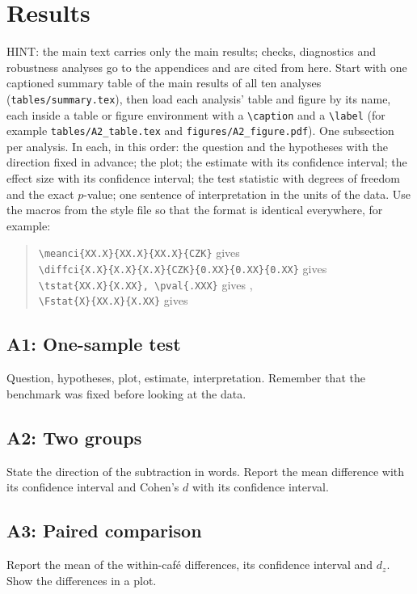 \documentclass[11pt,a4paper]{article}
\begin{document}
\section{Results}

HINT: the main text carries only the main results; checks, diagnostics and robustness analyses go to the appendices and are cited from here. Start with one captioned summary table of the main results of all ten analyses (\verb|tables/summary.tex|), then load each analysis' table and figure by its name, each inside a table or figure environment with a \verb|\caption| and a \verb|\label| (for example \verb|tables/A2_table.tex| and \verb|figures/A2_figure.pdf|). One subsection per analysis. In each, in this order: the question and the hypotheses with the direction fixed in advance; the plot; the estimate with its confidence interval; the effect size with its confidence interval; the test statistic with degrees of freedom and the exact $p$-value; one sentence of interpretation in the units of the data. Use the macros from the style file so that the format is identical everywhere, for example:

\begin{quote}\small
\verb|\meanci{XX.X}{XX.X}{XX.X}{CZK}| gives \\
\verb|\diffci{X.X}{X.X}{X.X}{CZK}{0.XX}{0.XX}{0.XX}| gives \\
\verb|\tstat{XX.X}{X.XX}, \pval{.XXX}| gives , \\
\verb|\Fstat{X}{XX.X}{X.XX}| gives 
\end{quote}

\subsection{A1: One-sample test}
Question, hypotheses, plot, estimate, interpretation. Remember that the benchmark was fixed before looking at the data.

\subsection{A2: Two groups}
State the direction of the subtraction in words. Report the mean difference with its confidence interval and Cohen's $d$ with its confidence interval.

\subsection{A3: Paired comparison}
Report the mean of the within-caf\'e differences, its confidence interval and $d_z$. Show the differences in a plot.
\end{document}
